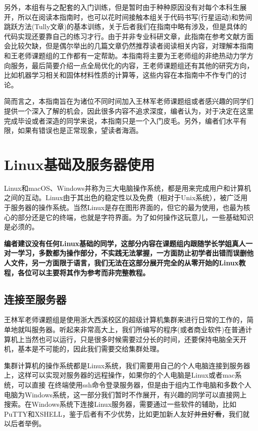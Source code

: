 \documentclass[12pt,a4paper,openany,twoside]{book}
\numberwithin{equation}{section}
\begin{document}
      另外，本组有与之配套的入门训练，但是暂时由于种种原因没有对每个本科生展开，所以在阅读本指南时，也可以花时间接触本组关于代码书写(行星运动)和势间跳跃方法(Tully文章)的基本训练，关于后者我们在指南中略有涉及，但是具体的代码实现还要靠自己的练习才行。由于并非专业科研文章，此指南在参考文献方面会比较欠缺，但是偶尔举出的几篇文章仍然推荐读者阅读相关内容，对理解本指南和王老师课题组的工作都有一定帮助。本指南将主要为王老师组的非绝热动力学方向服务，最后简要介绍一点全局优化的内容，王老师课题组还有其他的研究方向，比如机器学习相关和固体材料性质的计算等，这些内容在本指南中不作专门的讨论。
      
      简而言之，本指南旨在为诸位不同时间加入王林军老师课题组或者感兴趣的同学们提供一个深入了解的机会，因此很多内容不追求深度，编者认为，对于决定在这里完成毕设或者深造的同学来说，本指南只是一个入门皮毛。另外，编者们水平有限，如果有错误也是正常现象，望读者海涵。

    \chapter{Linux基础及服务器使用}
      Linux和macOS、Windows并称为三大电脑操作系统，都是用来完成用户和计算机之间的互动。Linux由于其出色的稳定性以及免费（相对于Unix系统），被广泛用于服务器的操作系统。当然Linux是存在图形界面的，但它的最为使用，也最为核心的部分还是它的终端，也就是字符界面。为了如何操作这玩意儿，一些基础知识是必须的。

      {\color{red}\textbf{编者建议没有任何Linux基础的同学，这部分内容在课题组内跟随学长学姐真人一对一学习，多数都为操作部分，不实践无法掌握，一方面防止初学者出错而误删他人文件，另一方面限于语言，我们无法在这部分展开完全的从零开始的Linux教程，各位可以主要将其作为参考而非完整教程。}}

      \section{连接至服务器}
        王林军老师课题组是使用浙大西溪校区的超级计算机集群来进行日常的工作的，简单地就叫服务器。听起来非常高大上，我们所编写的程序(或者商业软件)在普通计算机上当然也可以运行，只是很多时候需要过分长的时间，还要保持电脑全天开机，基本是不可能的，因此我们需要交给集群处理。

        集群计算机的操作系统都是Linux系统，我们需要用自己的个人电脑连接到服务器上，这样可以实现对服务器的远程操作，如果你的个人电脑是Linux或者mac系统，可以直接
        在终端使用ssh命令登录服务器，但是由于组内工作电脑和多数个人电脑为Windows系统，这一部分我们暂时不作展开，有兴趣的同学可以直接网上搜索。在Windows系统下连接Linux服务器，需要通过一些软件的辅助，比如PuTTY和XSHELL，鉴于后者有不少优势，比如更加新人友好\sout{并且好看}，我们就以后者举例。
\end{document}
